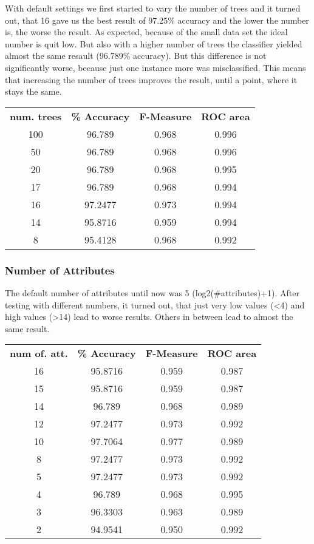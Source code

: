 \documentclass{article}
\begin{document}
With default settings we first started to vary the number of trees and it turned out, that 16 gave us the best result of 97.25\% accuracy and the lower the number is, the worse the result. As expected, because of the small data set the ideal number is quit low. But also with a higher number of trees the classifier yielded almost the same resault (96.789\% accuracy). But this difference is not significantly worse, because just one instance more was misclassified. This means that increasing the number of trees improves the result, until a point, where it stays the same.
 
\begin{center}
\begin{tabular}{ c | c | c | c }
\textbf{num. trees} & \textbf{\% Accuracy} & \textbf{F-Measure} & \textbf{ROC area} \\
100 & 96.789 & 0.968 & 0.996 \\
50 & 96.789 & 0.968 &  0.996 \\
20 & 96.789 & 0.968 & 0.995 \\
17 & 96.789 & 0.968 & 0.994 \\
16 & 97.2477 & 0.973 & 0.994 \\
14 & 95.8716 & 0.959 & 0.994 \\
8 & 95.4128 & 0.968 & 0.992 \\
\end{tabular}
\end{center}
 
\subsubsection{Number of Attributes}
 
The default number of attributes until now was 5 (log2(#attributes)+1). After testing with different numbers, it turned out, that just very low values (<4) and high values (>14) lead to worse results. Others in between lead to almost the same result.
 
\begin{center}
\begin{tabular}{ c | c | c | c }
\textbf{num of. att.} & \textbf{\% Accuracy} & \textbf{F-Measure} & \textbf{ROC area} \\
16 & 95.8716 & 0.959 & 0.987  \\
15 & 95.8716 & 0.959 & 0.987 \\
14 & 96.789 &  0.968 & 0.989 \\
12 & 97.2477 & 0.973 & 0.992 \\
10 & 97.7064 & 0.977 & 0.989 \\
8 & 97.2477 & 0.973 & 0.992 \\
5 & 97.2477 & 0.973 & 0.992 \\
4 & 96.789 & 0.968 & 0.995 \\
3 & 96.3303 & 0.963 & 0.989 \\
2 & 94.9541 & 0.950 & 0.992 \\
\end{tabular}
\end{center} 
\end{document}
